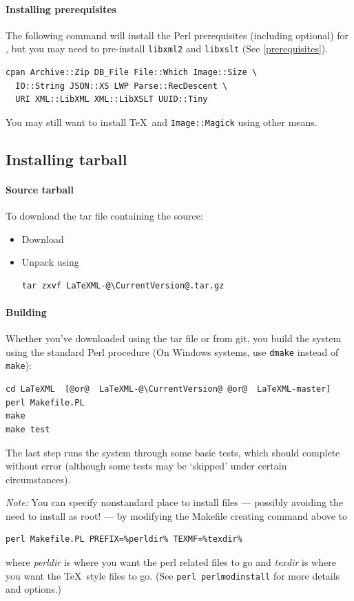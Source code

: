 \documentclass{article}
\begin{document}
\paragraph{Installing prerequisites}\label{install.cpan.prereq}
The following command will install the Perl prerequisites (including optional)
for \LaTeXML, but you may need to pre-install \texttt{libxml2} and  \texttt{libxslt} (See \ref{prerequisites}).
\begin{lstlisting}[style=shell]
cpan Archive::Zip DB_File File::Which Image::Size \
  IO::String JSON::XS LWP Parse::RecDescent \
  URI XML::LibXML XML::LibXSLT UUID::Tiny
\end{lstlisting}
You may still want to install \TeX\ and \texttt{Image::Magick}
using other means.

\subsection{Installing tarball}\label{install.tarball}
\paragraph{Source tarball}\label{source.tarball}
To download the tar file containing the source:
\begin{itemize}
\item Download \CurrentTarball
\item Unpack using
\begin{lstlisting}[style=shell]
tar zxvf LaTeXML-@\CurrentVersion@.tar.gz
\end{lstlisting}
\end{itemize}

\paragraph{Building}\label{build.source}
Whether you've downloaded using the tar file or from git,
you build the system using the standard Perl procedure
(On Windows systems, use \texttt{dmake} instead of \texttt{make}):
\begin{lstlisting}[style=shell]
cd LaTeXML  [@or@  LaTeXML-@\CurrentVersion@ @or@  LaTeXML-master]
perl Makefile.PL
make
make test
\end{lstlisting}
The last step runs the system through some basic tests,
which should complete without error (although some tests may be `skipped'
under certain circumstances).


\emph{Note:} You can specify nonstandard place to install files
--- possibly avoiding the need to install as root! ---
by modifying the Makefile creating command above to
\begin{lstlisting}[style=shell]
perl Makefile.PL PREFIX=%perldir% TEXMF=%texdir%
\end{lstlisting}
where \emph{perldir} is where you want the perl related files to go and
\emph{texdir} is where you want the \TeX\ style files to go.
(See \texttt{perl perlmodinstall} for more details and options.)
\end{document}

